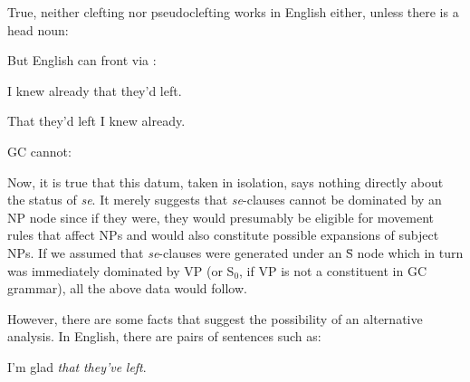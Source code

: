 \z

\z

\z

\z

\z

\z

\noindent True, neither clefting nor pseudoclefting works in English either, unless there is a head noun:

\z

\z
But English can front via :

\ea\label{ex:2:177}
I knew already that they'd left.
\z

\ea\label{ex:2:178}
That they'd left I knew already.
\z

\noindent GC cannot:

\z

\z

Now, it is true that this datum, taken in isolation, says nothing directly about the status of \textit{se}. It merely suggests that \textit{se}-clauses cannot be dominated by an NP node since if they were, they would presumably be eligible for movement rules that affect NPs and would also constitute possible expansions of subject NPs. If we assumed that \textit{se}-clauses were generated under an \=S node which in turn was immediately dominated by VP (or S$_0$, if VP is not a constituent in GC grammar), all the above data would follow.

However, there are some facts that suggest the possibility of
an alternative analysis. In English, there are pairs of sentences such as:

\ea\label{ex:2:181}
I'm glad \textit{that} \textit{they've} \textit{left}.
\z

